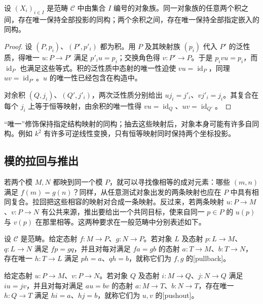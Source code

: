 \begin{proposition}\label{b2:prop:universal-object-uniqueness}
	设 \((X_i)_{i\in I}\) 是范畴 \(\mathcal C\) 中由集合 \(I\) 编号的对象族。同一对象族的任意两个积之间，存在唯一保持全部投影的同构；两个余积之间，存在唯一保持全部指定嵌入的同构。
\end{proposition}
\begin{proof}
	设 \((P,p_i)\)、\((P',p'_i)\) 都为积。用 \(P\) 及其映射族 \((p_i)\) 代入 \(P'\) 的泛性质，得唯一 \(u:P\rightarrow P'\) 满足 \(p'_iu=p_i\)；交换角色得 \(v:P'\rightarrow P\)。于是 \(p_ivu=p_i\)，而 \(\operatorname{id}_P\) 也满足这些等式。积的泛性质中态射的唯一性迫使 \(vu=\operatorname{id}_P\)，同理 \(uv=\operatorname{id}_{P'}\)。\(u\) 的唯一性已经包含在构造中。

	对余积 \((Q,j_i)\)、\((Q',j'_i)\)，两次泛性质分别给出 \(u j_i=j'_i\)、\(v j'_i=j_i\)。其复合在每个 \(j_i\) 上等于恒等映射，由余积的唯一性得 \(vu=\operatorname{id}_Q\)、\(uv=\operatorname{id}_{Q'}\)。
\end{proof}

“唯一”修饰保持指定结构映射的同构；抽去这些映射后，对象本身可能有许多自同构。例如 \(k^2\) 有许多可逆线性变换，只有恒等映射同时保持两个坐标投影。

\subsection{模的拉回与推出}
\label{b2:subsec:0503:02}

若两个模 \(M,N\) 都映到同一个模 \(P\)，就可以寻找像相等的成对元素：哪些 \((m,n)\) 满足 \(f(m)=g(n)\)？同样，从任意测试对象出发的两条映射也应在 \(P\) 中具有相同复合。拉回把这些相容的映射对合成一条映射。反过来，若两条映射 \(u:P\to M\)、\(v:P\to N\) 有公共来源，推出要给出一个共同目标，使来自同一 \(p\in P\) 的 \(u(p)\) 与 \(v(p)\) 在那里相等。这两种要求在一般范畴中分别表述如下。

\begin{definition}\label{b2:def:pullback-pushout}
	设 \(\mathcal C\) 是范畴。给定态射 \(f:M\rightarrow P\)、\(g:N\rightarrow P\)。若对象 \(L\) 及态射 \(p:L\rightarrow M\)、\(q:L\rightarrow N\) 满足 \(fp=gq\)，并且对每对满足 \(fa=gb\) 的态射 \(a:T\rightarrow M\)、\(b:T\rightarrow N\)，存在唯一 \(h:T\rightarrow L\) 满足 \(ph=a\)、\(qh=b\)，就称它们为 \(f,g\) 的[pullback]。

	给定态射 \(u:P\rightarrow M\)、\(v:P\rightarrow N\)。若对象 \(Q\) 及态射 \(i:M\rightarrow Q\)、\(j:N\rightarrow Q\) 满足 \(iu=jv\)，并且对每对满足 \(au=bv\) 的态射 \(a:M\rightarrow T\)、\(b:N\rightarrow T\)，存在唯一 \(h:Q\rightarrow T\) 满足 \(hi=a\)、\(hj=b\)，就称它们为 \(u,v\) 的[pushout]。
\end{definition}

